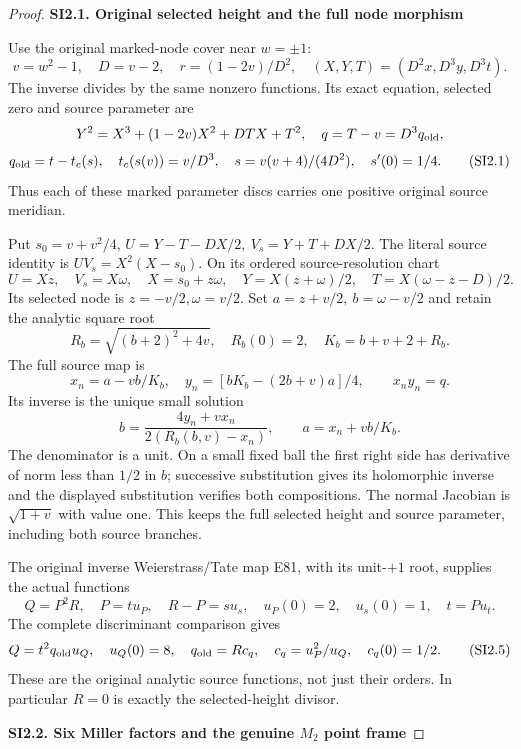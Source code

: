 \begin{proof}
\par

\medskip\noindent\textbf{SI2.1. Original selected height and the full node morphism}

\par\nobreak

Use the original marked-node cover near \(w=\pm1\):
\[
 v=w^2-1,\quad D=v-2,\quad r=(1-2v)/D^2,\quad
 (X,Y,T)=(D^2x,D^3y,D^3t).
\]
The inverse divides by the same nonzero functions. Its exact equation,
selected zero and source parameter are
\[
 Y^2=X^3+(1-2v)X^2+DTX+T^2,\quad q=T-v=D^3q_{\rm old},
\]
\[
 q_{\rm old}=t-t_c(s),\quad
 t_c(s(v))=v/D^3,\quad s=v(v+4)/(4D^2),\quad s'(0)=1/4.
 \tag{SI2.1}
\]
Thus each of these marked parameter discs carries one positive
original source meridian.

Put \(s_0=v+v^2/4\),
\(U=Y-T-DX/2,\ V_s=Y+T+DX/2\). The literal source identity is
\(UV_s=X^2(X-s_0)\). On its ordered source-resolution chart
\[
 U=Xz,\quad V_s=X\omega,\quad X=s_0+z\omega,\quad
 Y=X(z+\omega)/2,\quad T=X(\omega-z-D)/2.
 \tag{SI2.2}
\]
Its selected node is \(z=-v/2,\omega=v/2\). Set
\(a=z+v/2,\ b=\omega-v/2\) and retain the analytic square root
\[
 R_b=\sqrt{(b+2)^2+4v},\quad R_b(0)=2,\quad K_b=b+v+2+R_b.
\]
The full source map is
\[
 x_n=a-vb/K_b,\quad
 y_n=[bK_b-(2b+v)a]/4,\qquad x_ny_n=q.
 \tag{SI2.3}
\]
Its inverse is the unique small solution
\[
 b=\frac{4y_n+vx_n}{2(R_b(b,v)-x_n)},\qquad
 a=x_n+vb/K_b.
 \tag{SI2.4}
\]
The denominator is a unit. On a small fixed ball the first right
side has derivative of norm less than \(1/2\) in \(b\); successive
substitution gives its holomorphic inverse and the displayed
substitution verifies both compositions. The normal Jacobian is
\(\sqrt{1+v}\) with value one. This keeps the full selected height
and source parameter, including both source branches.

The original inverse Weierstrass/Tate map E81, with its unit-\(+1\)
root, supplies the actual functions
\[
 Q=P^2R,\quad P=t u_P,\quad R-P=s u_s,\quad
 u_P(0)=2,\quad u_s(0)=1,\quad t=P u_t.
\]
The complete discriminant comparison gives
\[
 Q=t^2q_{\rm old}u_Q,\quad u_Q(0)=8,\quad
 q_{\rm old}=R c_q,\quad c_q=u_P^2/u_Q,\quad c_q(0)=1/2.
 \tag{SI2.5}
\]
These are the original analytic source functions, not just their
orders. In particular \(R=0\) is exactly the selected-height divisor.

\par

\medskip\noindent\textbf{SI2.2. Six Miller factors and the genuine \(M_{2}\) point frame}


\end{proof}
